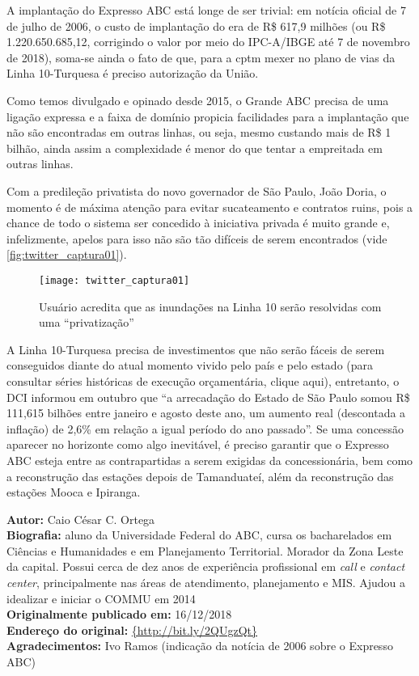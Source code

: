 \documentclass[11pt,fleqn]{book} %
\newcommand{\infocaio}[2]{\textbf{Autor:} Caio C\'{e}sar C. Ortega \\ \textbf{Biografia:} aluno da Universidade Federal do ABC, cursa os bacharelados em Ci\^{e}ncias e Humanidades e em Planejamento Territorial. Morador da Zona Leste da capital. Possui cerca de dez anos de experi\^{e}ncia profissional em \textit{call} e \textit{contact center}, principalmente nas \'{a}reas de atendimento, planejamento e MIS. Ajudou a idealizar e iniciar o COMMU em 2014 \\ \textbf{Originalmente publicado em:} {#1} \\ \textbf{Endere\c{c}o do original:} \url{{#2}}}
\begin{document}

A implantação do Expresso ABC está longe de ser trivial: em notícia oficial de 7 de julho de 2006, o custo de implantação do era de R\$ 617,9 milhões (ou R\$ 1.220.650.685,12, corrigindo o valor por meio do IPC-A/IBGE até 7 de novembro de 2018), soma-se ainda o fato de que, para a \gls{cptm} mexer no plano de vias da Linha 10-Turquesa é preciso autorização da União.

Como temos divulgado e opinado desde 2015, o Grande ABC precisa de uma ligação expressa e a faixa de domínio propicia facilidades para a implantação que não são encontradas em outras linhas, ou seja, mesmo custando mais de R\$ 1 bilhão, ainda assim a complexidade é menor do que tentar a empreitada em outras linhas.

Com a predileção privatista do novo governador de São Paulo, João Doria, o momento é de máxima atenção para evitar sucateamento e contratos ruins, pois a chance de todo o sistema ser concedido à iniciativa privada é muito grande e, infelizmente, apelos para isso não são tão difíceis de serem encontrados (vide \autoref{fig:twitter_captura01}).

\begin{wrapfigure}{l}{0.5\textwidth}
	\centering
	\caption[Tuíte pró-privatização da Linha 10]{Usuário acredita que as inundações na Linha 10 serão resolvidas com uma ``privatização''}
	\texttt{[image: twitter\_captura01]}
	\label{fig:twitter_captura01}
\end{wrapfigure}

A Linha 10-Turquesa precisa de investimentos que não serão fáceis de serem conseguidos diante do atual momento vivido pelo país e pelo estado (para consultar séries históricas de execução orçamentária, clique aqui), entretanto, o DCI informou em outubro que “a arrecadação do Estado de São Paulo somou R\$ 111,615 bilhões entre janeiro e agosto deste ano, um aumento real (descontada a inflação) de 2,6\% em relação a igual período do ano passado”. Se uma concessão aparecer no horizonte como algo inevitável, é preciso garantir que o Expresso ABC esteja entre as contrapartidas a serem exigidas da concessionária, bem como a reconstrução das estações depois de Tamanduateí, além da reconstrução das estações Mooca e Ipiranga.

\begin{info}
	\infocaio{16/12/2018}{http://bit.ly/2QUgzQt}\\
	\textbf{Agradecimentos:} Ivo Ramos (indicação da notícia de 2006 sobre o Expresso ABC)
\end{info}
\end{document}
